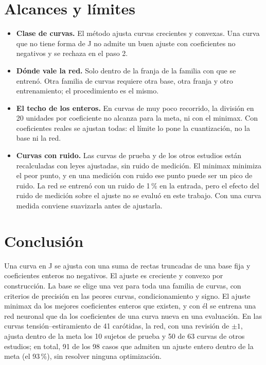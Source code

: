 \section{Alcances y límites}
\begin{itemize}
\item \textbf{Clase de curvas.} El método ajusta curvas crecientes y convexas. Una curva que no tiene forma de J no admite un buen ajuste con coeficientes no negativos y se rechaza en el paso 2.
\item \textbf{Dónde vale la red.} Solo dentro de la franja de la familia con que se entrenó. Otra familia de curvas requiere otra base, otra franja y otro entrenamiento; el procedimiento es el mismo.
\item \textbf{El techo de los enteros.} En curvas de muy poco recorrido, la división en 20 unidades por coeficiente no alcanza para la meta, ni con el minimax. Con coeficientes reales se ajustan todas: el límite lo pone la cuantización, no la base ni la red.
\item \textbf{Curvas con ruido.} Las curvas de prueba y de los otros estudios están recalculadas con leyes ajustadas, sin ruido de medición. El minimax minimiza el peor punto, y en una medición con ruido ese punto puede ser un pico de ruido. La red se entrenó con un ruido de 1\,\% en la entrada, pero el efecto del ruido de medición sobre el ajuste no se evaluó en este trabajo. Con una curva medida conviene suavizarla antes de ajustarla.
\end{itemize}

\section{Conclusión}
Una curva en J se ajusta con una suma de rectas truncadas de una base fija y coeficientes enteros no negativos. El ajuste es creciente y convexo por construcción. La base se elige una vez para toda una familia de curvas, con criterios de precisión en las peores curvas, condicionamiento y signo. El ajuste minimax da los mejores coeficientes enteros que existen, y con él se entrena una red neuronal que da los coeficientes de una curva nueva en una evaluación. En las curvas tensión--estiramiento de 41 carótidas, la red, con una revisión de $\pm1$, ajusta dentro de la meta los 10 sujetos de prueba y 50 de 63 curvas de otros estudios; en total, 91 de los 98 casos que admiten un ajuste entero dentro de la meta (el 93\,\%), sin resolver ninguna optimización.

